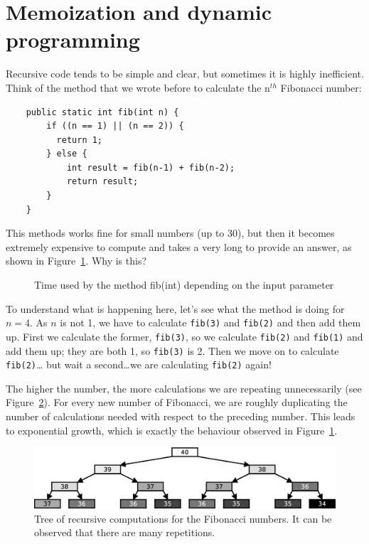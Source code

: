 \vspace{1cm}

\section{Memoization and dynamic programming}
\label{sec:memo-dynam-progr}

Recursive code tends to be simple and clear, but sometimes it is
highly inefficient. Think of the method that we wrote before to
calculate the n$^{th}$ Fibonacci number: 

\begin{verbatim}
    public static int fib(int n) {
        if ((n == 1) || (n == 2)) {
          return 1; 
        } else {
            int result = fib(n-1) + fib(n-2);
            return result;
        }
    }
\end{verbatim}

This methods works fine for small numbers (up to 30), but then it
becomes extremely expensive to compute and takes a very long to
provide an answer, as shown in Figure~\ref{fig:fibotime}. Why is this? 

\begin{figure}[hbtp]
  \centering
  
  \caption{Time used by the method fib(int) depending on the input parameter}
  \label{fig:fibotime}
\end{figure}

To understand what is happening here, let's see what the method is
doing for $n = 4$. As $n$ is not 1, 
we have to calculate \verb+fib(3)+ and \verb+fib(2)+
and then add them up. First we calculate the former, \verb+fib(3)+, so
we calculate \verb+fib(2)+ and \verb+fib(1)+ and add them up; they are both 1, so
\verb+fib(3)+ is 2. Then we move on to calculate \verb+fib(2)+\ldots
but wait a second\ldots we are calculating \verb+fib(2)+ again! 

The higher the number, the more calculations we are repeating
unnecessarily (see Figure~\ref{fig:fibotree}). For every new number of
Fibonacci, we are roughly duplicating the number of calculations
needed with respect to the preceding number. This leads to exponential
growth, which is exactly the behaviour observed in
Figure~\ref{fig:fibotime}. 

\begin{figure}[hbtp]
  \centering
  \includegraphics[width=\textwidth]{gfx/factorial-tree}
  \caption{Tree of recursive computations for the Fibonacci numbers. It can be observed that there are many repetitions. }
  \label{fig:fibotree}
\end{figure}

